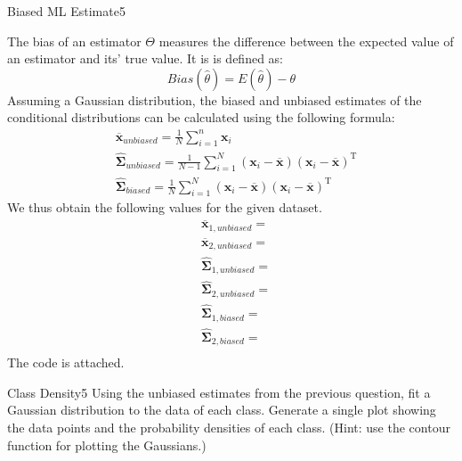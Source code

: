 \begin{questions}
\begin{question}{Biased ML Estimate}{5}
\begin{answer}
The bias of an estimator $\Theta$ measures the difference between the expected value of an estimator and its' true value. It is is defined as:
\begin{equation*}
Bias(\widehat{\theta})= E(\widehat{\theta}) - \theta
\end{equation*}
Assuming a Gaussian distribution, the biased and unbiased estimates of the conditional distributions can be calculated using the following formula:
\begin{align*}
&\overline{\mathbf{x}}_{unbiased}= \frac{1}{N} \sum_{i=1}^{n} \mathbf{x}_{i} \\
&\widehat{\boldsymbol{\Sigma}}_{unbiased}=\frac{1}{N-1} \sum_{i=1}^{N}(\mathbf{x}_{i}-\overline{\mathbf{x}})(\mathbf{x}_{i}-\overline{\mathbf{x}})^{\mathrm{T}} \\
&\widehat{\boldsymbol{\Sigma}}_{biased}=\frac{1}{N} \sum_{i=1}^{N}(\mathbf{x}_{i}-\overline{\mathbf{x}})(\mathbf{x}_{i}-\overline{\mathbf{x}})^{\mathrm{T}}
\end{align*}
We thus obtain the following values for the given dataset.
\begin{align*}
&\overline{\mathbf{x}}_{1, unbiased} =\\
&\overline{\mathbf{x}}_{2, unbiased} =\\
&\widehat{\boldsymbol{\Sigma}}_{1, unbiased} =\\
&\widehat{\boldsymbol{\Sigma}}_{2, unbiased} =\\
&\widehat{\boldsymbol{\Sigma}}_{1, biased} =\\
&\widehat{\boldsymbol{\Sigma}}_{2, biased} =\\
\end{align*}
The code is attached.
\end{answer}
\end{question}



\begin{question}{Class Density}{5}
Using the unbiased estimates from the previous question, fit a Gaussian distribution to the data of each class. Generate a single plot showing the data points and the probability densities of each class.
(Hint: use the contour function for plotting the Gaussians.) 

\begin{answer}\end{answer}

\end{question}


\end{questions}
